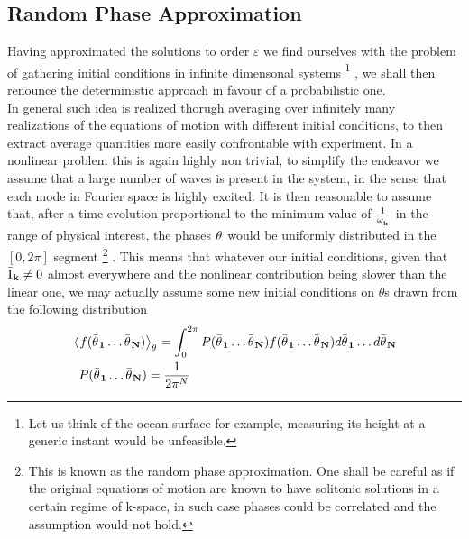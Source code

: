 \subsection{Random Phase Approximation}

Having approximated the solutions to order $\varepsilon$ we find ourselves with the problem of gathering 
initial conditions in infinite dimensonal systems
\footnote{Let us think of the ocean surface for example, measuring its height at a generic instant would be unfeasible.}
, we shall then renounce the deterministic approach in favour of 
a probabilistic one.\\
In general such idea is realized thorugh averaging over infinitely many realizations of the equations of motion with different initial conditions, to then extract 
average quantities more easily confrontable with experiment. In a nonlinear problem this is again highly non trivial, to simplify the endeavor we assume that
a large number of waves is present in the system, in the sense that each mode in Fourier space is highly excited. It is then reasonable to assume that, after a time
evolution proportional to the minimum value of $\frac{1}{\omega^{}_{\mathbf{k}}}$ in the range of physical interest, the phases $\theta^{}$ would be uniformly distributed in the $\left[0,2\pi\right]$ segment 
\footnote{This is known as the random phase approximation. One shall be careful as if the original equations of motion are known to have solitonic solutions in a certain regime of k-space, 
in such case phases could be correlated and the assumption would not hold.}
. This means that whatever our initial conditions, given that $\bar{\mathrm{I}^{}}_\mathbf{k} \neq 0$ almost everywhere and the nonlinear contribution being slower than the linear one,
we may actually assume some new initial conditions on $\theta$s drawn from the following distribution
\begin{equation}
    \begin{aligned}
    &\left\langle f(\bar{\theta^{}}_\mathbf{1} \dots \bar{\theta^{}}_\mathbf{N}) \right\rangle_{\bar{\theta}^{}} = 
    \int_{0}^{2\pi} P(\bar{\theta^{}}_\mathbf{1} \dots \bar{\theta^{}}_\mathbf{N})f(\bar{\theta^{}}_\mathbf{1} \dots 
    \bar{\theta^{}}_\mathbf{N}) d\bar{\theta^{}}_\mathbf{1} \dots d\bar{\theta^{}}_\mathbf{N} 
     \\
    & \hspace{2mm} P(\bar{\theta^{}}_\mathbf{1} \dots \bar{\theta^{}}_\mathbf{N}) = \frac{1}{2\pi^{N}}
    \end{aligned}
\end{equation}

